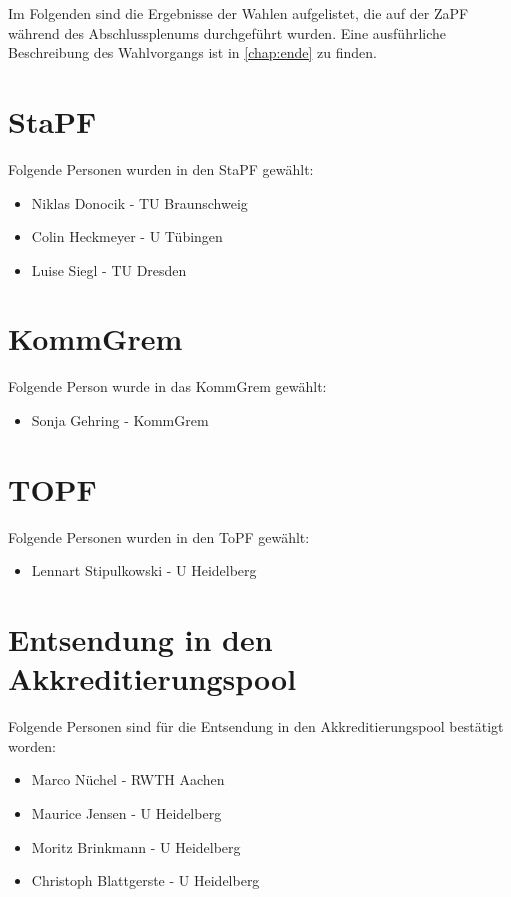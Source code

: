 
\label{chap:wahlen}

Im Folgenden sind die Ergebnisse der Wahlen aufgelistet, die auf der ZaPF während des Abschlussplenums durchgeführt wurden.
Eine ausführliche Beschreibung des Wahlvorgangs ist in \ref{chap:ende} zu finden.

    \section{StaPF}
      Folgende Personen wurden in den StaPF gewählt:
        \begin{itemize}
          \item Niklas Donocik - TU Braunschweig
          \item Colin Heckmeyer - U Tübingen
          \item Luise Siegl - TU Dresden
        \end{itemize}

    \section{KommGrem}
      Folgende Person wurde in das KommGrem gewählt:
      \begin{itemize}
        \item Sonja Gehring - KommGrem
      \end{itemize}

    \section{TOPF}
      Folgende Personen wurden in den ToPF gewählt:
      \begin{itemize}
        \item Lennart Stipulkowski - U Heidelberg
      \end{itemize}


    \section{Entsendung in den Akkreditierungspool}
      Folgende Personen sind für die Entsendung in den Akkreditierungspool bestätigt worden:
      \begin{itemize}
        \item Marco Nüchel - RWTH Aachen
        \item Maurice Jensen - U Heidelberg
        \item Moritz Brinkmann - U Heidelberg
        \item Christoph Blattgerste - U Heidelberg
      \end{itemize}

